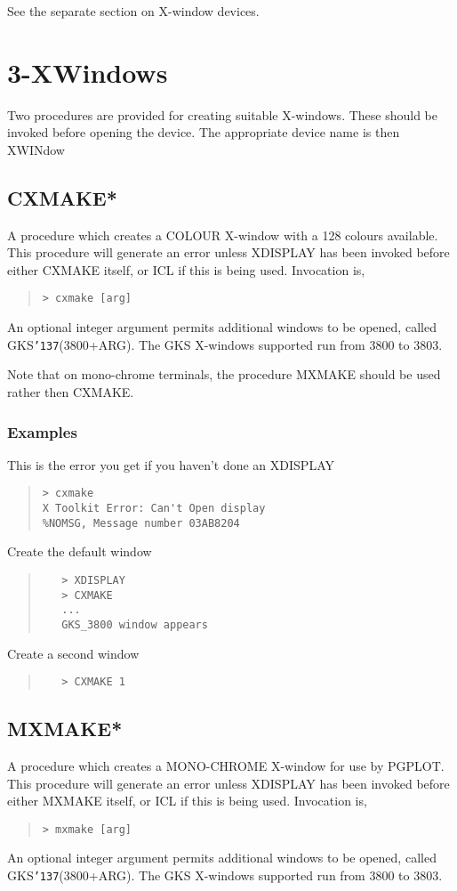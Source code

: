 \documentclass{book}
\renewcommand{\_}{{\tt\char'137}}     %
\begin{document}
See the separate section on X-window devices.
 
\section{3-XWindows}
Two procedures are provided for creating suitable X-windows. These
should be invoked before opening the device. The appropriate device
name is then XWINdow
 
\subsection{CXMAKE*}
A procedure which creates a COLOUR X-window with a 128 colours
available. This procedure will generate an error unless XDISPLAY
has been invoked before either CXMAKE itself, or ICL if this is
being used. Invocation is,
\begin{quote}\begin{verbatim}
> cxmake [arg]
\end{verbatim}\end{quote}
An optional integer argument permits additional windows to be
opened, called GKS\_(3800+ARG). The GKS X-windows supported run
from 3800 to 3803.
 
Note that on mono-chrome terminals, the procedure MXMAKE should
be used rather then CXMAKE.
 
\subsubsection{Examples}
This is the error you get if you haven't done an XDISPLAY
\begin{quote}\begin{verbatim}
> cxmake
X Toolkit Error: Can't Open display
%NOMSG, Message number 03AB8204
\end{verbatim}\end{quote}
Create the default window
\begin{quote}\begin{verbatim}
   > XDISPLAY
   > CXMAKE
   ...
   GKS_3800 window appears
\end{verbatim}\end{quote}
Create a second window
\begin{quote}\begin{verbatim}
   > CXMAKE 1
\end{verbatim}\end{quote}
\subsection{MXMAKE*}
A procedure which creates a MONO-CHROME X-window for use by PGPLOT.
This procedure will generate an error unless XDISPLAY has been
invoked before either MXMAKE itself, or ICL if this is being used.
Invocation is,
\begin{quote}\begin{verbatim}
> mxmake [arg]
\end{verbatim}\end{quote}
An optional integer argument permits additional windows to be
opened, called GKS\_(3800+ARG). The GKS X-windows supported run
from 3800 to 3803.
\end{document}
